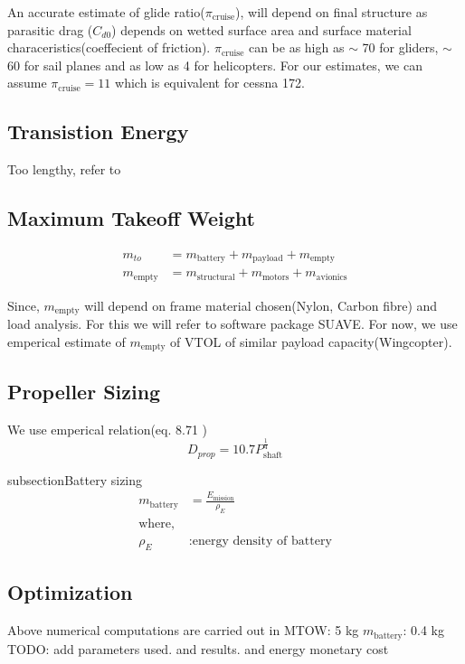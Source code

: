 An accurate estimate of glide ratio($\pi_\text{cruise}$)\cite{Lifttodr0:online}, will depend on final structure as parasitic drag ($C_{d0}$) depends on wetted surface area and surface material characeristics(coeffecient of friction). $\pi_\text{cruise}$ can be as high as $\sim$ 70 for gliders, $\sim$ 60 for sail planes and as low as 4 for helicopters. For our estimates, we can assume $\pi_\text{cruise}=11$ which is equivalent for cessna 172.

\subsection{Transistion Energy}
Too lengthy, refer to \cite{kamal2018design}

\subsection{Maximum Takeoff Weight}
\begin{align*}
    m_{to} &= m_{\text{battery}} + m_{\text{payload}} + m_{\text{empty}}\\
    m_{\text{empty}} &= m_{\text{structural}} + m_{\text{motors}} + m_{\text{avionics}}
\end{align*}

Since, $m_{\text{empty}}$ will depend on frame material chosen(Nylon, Carbon fibre) and load analysis. For this we will refer to software package SUAVE\cite{lukaczyk2015suave}. For now, we use emperical estimate of $m_{\text{empty}}$ of VTOL of similar payload capacity(Wingcopter).

\subsection{Propeller Sizing}

We use emperical relation(eq. 8.71 \cite{anderson1999aircraft})
\begin{equation*}
    D_{prop} = 10.7 P_\text{shaft}^\frac{1}{4}
\end{equation*}

subsection{Battery sizing}
\begin{align*}
    m_\text{battery} &= \frac{E_\text{mission}}{\rho_E}\\
    \text{where,}\\
    \rho_E &: \text{energy density of battery}
\end{align*}

\subsection{Optimization}
Above numerical computations are carried out in \cite{VTOLdesi25:online}
MTOW: 5 kg
$m_\text{battery}$: 0.4 kg
TODO: add parameters used. and results. and energy monetary cost